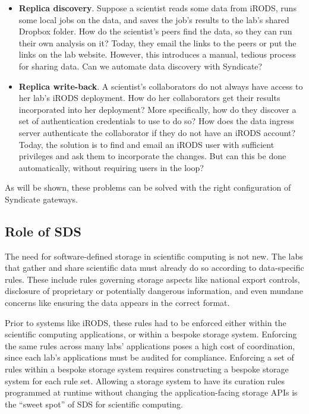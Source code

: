 \begin{itemize}
\item \textbf{Replica discovery}.  Suppose a scientist reads some data from iRODS,
runs some local jobs on the data, and saves the job's results to the lab's shared Dropbox
folder.  How do the scientist's peers find the data, so they can run their own
analysis on it?  Today, they email the links to the peers or put the links on the lab
website.  However, this introduces a manual, tedious process for sharing data.  Can we
automate data discovery with Syndicate?
\item \textbf{Replica write-back}.  A scientist's collaborators do not always
have access to her lab's iRODS deployment.  How do her collaborators get their results incorporated
into her deployment?  More specifically, how do they discover a set of
authentication credentials to use to do so?  How does the data ingress server authenticate the
collaborator if they do not have an iRODS account?  Today, the solution is to find
and email an iRODS user with sufficient privileges and ask them to incorporate
the changes.  But can this be done automatically, without requiring users
in the loop?
\end{itemize}

As will be shown, these problems can be solved with the right configuration of Syndicate gateways.

\subsection{Role of SDS}

The need for software-defined storage in scientific computing is not new.  The
labs that gather and share scientific data must already do so according to
data-specific rules.  These include rules governing storage aspects like
national export controls, disclosure of proprietary or potentially dangerous information, and
even mundane concerns like ensuring the data appears in the correct format.

Prior to systems like iRODS, these rules had to be enforced either within the
scientific computing applications, or within a bespoke storage system.
Enforcing the same rules across many labs' applications poses a high cost of
coordination, since each lab's applications must be audited for compliance.
Enforcing a set of rules within a bespoke storage system requires constructing a
bespoke storage system for each rule set.  Allowing a storage system to have its
curation rules programmed at runtime without changing the application-facing
storage APIs is the ``sweet spot'' of SDS for scientific computing.

